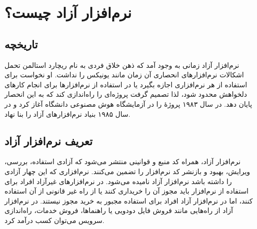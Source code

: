 \documentclass{article}
\begin{document}
\section{نرم‌افزار آزاد چیست؟}
\subsection{تاریخچه}
نرم‌افزار آزاد زمانی به وجود آمد که ذهن خلاق فردی به نام ریچارد استالمن تحمل اشکالات نرم‌افزارهای انحصاری آن زمان مانند یونیکس را نداشت. او نخواست برای استفاده از هر نرم‌افزاری اجازه بگیرد یا در استفاده از نرم‌افزارها برای انجام کار‌های دلخواهش محدود شود، لذا تصمیم گرفت پروژه‌ای را راه‌اندازی کند که به این انحصار پایان دهد. در سال ۱۹۸۳ پروژهٔ  را در آزمایشگاه هوش مصنوعی دانشگاه  آغاز کرد و در سال ۱۹۸۵ بنیاد نرم‌افزار‌های آزاد را بنا نهاد.

\subsection{تعریف نرم‌افزار آزاد}
نرم‌افزار آزاد، همراه کد منبع و قوانینی منتشر می‌شود که آزادی استفاده، بررسی، ویرایش، بهبود و بازنشر کد نرم‌افزار را تضمین می‌کنند. نرم‌افزاری که این چهار آزادی را داشته باشد نرم‌افزار آزاد نامیده می‌شود. در نرم‌افزارهای غیرآزاد افراد برای استفاده از نرم‌افزار باید مجوز آن را خریداری کنند یا از راه غیر قانونی از آن استفاده کنند، اما در نرم‌افزار آزاد افراد برای استفاده مجبور به خرید مجوز نیستند. در نرم‌افزار آزاد از راه‌هایی مانند فروش فایل دودویی یا راهنماها، فروش خدمات، راه‌اندازی سرویس می‌توان کسب درآمد کرد.
\end{document}
